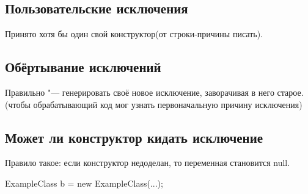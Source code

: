 \subsection{Пользовательские исключения}
Принято хотя бы один свой конструктор(от строки-причины писать).

\subsection{Обёртывание исключений}
Правильно "--- генерировать своё новое исключение, заворачивая в него старое.
(чтобы обрабатывающий код мог узнать первоначальную причину исключения)

\subsection{Может ли конструктор кидать исключение}
Правило такое: если конструктор недоделан, то переменная становится null.
\begin{javacode}
ExampleClass b = new ExampleClass(...);
\end{javacode}
